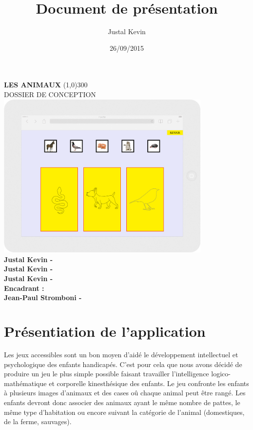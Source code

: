 \documentclass{article}
\title{Document de pr\'esentation}
\author{Justal Kevin}
\date{26/09/2015}
\begin{document}
\begin{center}
\textbf{\Huge{LES ANIMAUX}}
\line(1,0){300}\\
DOSSIER DE CONCEPTION\\
\vspace{3cm}
\includegraphics[width=0.8\textwidth]{tablette}\\
\vspace{3cm}
\textbf{Justal Kevin -  \color{black}{- SI5 - IHM}}\\
\textbf{Justal Kevin -  \color{black}{- SI5 - IHM}}\\
\textbf{Justal Kevin -  \color{black}{- SI5 - IHM}}\\
\vspace{4cm}
\textbf{Encadrant :}\\
\textbf{Jean-Paul Stromboni - }
\end{center}

\newpage
\tableofcontents

\newpage

\section{Pr\'esentiation de l'application}
\hspace*{0.6cm}Les jeux accessibles sont un bon moyen d'aid\'e le d\'eveloppement intellectuel et psychologique des enfants handicap\'es. C'est pour cela que nous avons décidé de produire un jeu le plus simple possible faisant travailler l'intelligence logico-math\'ematique et corporelle kinesth\'esique des enfants. Le jeu confronte les enfants à plusieurs images d'animaux et des cases o\^u chaque animal peut \^etre rang\'e. Les enfants devront donc associer des animaux ayant le m\^eme nombre de pattes, le m\^eme type d'habitation ou encore suivant la cat\'egorie de l'animal (domestiques, de la ferme, sauvages).
\end{document}
